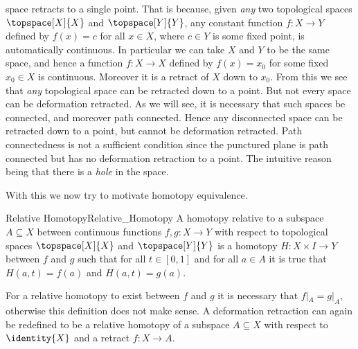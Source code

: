 \documentclass[oneside]{book}                                                  %
\begin{document}
                space retracts to a single point. That is because, given
                \textit{any} two topological spaces $\topspace[X]{X}$ and
                $\topspace[Y]{Y}$, any constant function $f:X\rightarrow{Y}$
                defined by $f(x)=c$ for all $x\in{X}$, where $c\in{Y}$ is some
                fixed point, is automatically continuous. In particular we can
                take $X$ and $Y$ to be the same space, and hence a function
                $f:X\rightarrow{X}$ defined by $f(x)=x_{0}$ for some fixed
                $x_{0}\in{X}$ is continuous. Moreover it is a retract of $X$
                down to $x_{0}$. From this we see that \textit{any} topological
                space can be retracted down to a point. But not every space can
                be deformation retracted. As we will see, it is necessary that
                such spaces be connected, and moreover path connected. Hence any
                disconnected space can be retracted down to a point, but cannot
                be deformation retracted. Path connectedness is not a sufficient
                condition since the punctured plane is path connected but has
                no deformation retraction to a point. The intuitive reason
                being that there is a \textit{hole} in the space.
                \par\hfill\par
                With this we now try to motivate homotopy equivalence.
                \begin{fdefinition}{Relative Homotopy}{Relative_Homotopy}
                    A homotopy relative to a subspace $A\subseteq{X}$ between
                    continuous functions $f,g:X\rightarrow{Y}$ with respect to
                    topological spaces $\topspace[X]{X}$ and $\topspace[Y]{Y}$
                    is a homotopy $H:X\times{I}\rightarrow{Y}$ between $f$ and
                    $g$ such that for all $t\in[0,1]$ and for all $a\in{A}$ it
                    is true that $H(a,t)=f(a)$ and $H(a,t)=g(a)$.
                \end{fdefinition}
                For a relative homotopy to exist between $f$ and $g$ it is
                necessary that $f|_{A}=g|_{A}$, otherwise this definition does
                not make sense. A deformation retraction can again be redefined
                to be a relative homotopy of a subspace $A\subseteq{X}$ with
                respect to $\identity{X}$ and a retract $f:X\rightarrow{A}$.
                \par\hfill\par
\end{document}
